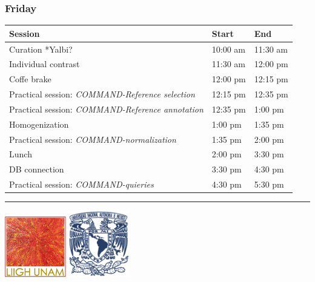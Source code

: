 \documentclass[]{article}
\begin{document}
\subsubsection{Friday}\label{friday}

\begin{longtable}[]{@{}lll@{}}
\toprule
Session & Start & End\tabularnewline
\midrule
\endhead
Curation *Yalbi? & 10:00 am & 11:30 am\tabularnewline
Individual contrast & 11:30 am & 12:00 pm\tabularnewline
 Coffe brake & 12:00 pm & 12:15 pm\tabularnewline
 Practical session: \emph{COMMAND-Reference selection} & 12:15 pm &
12:35 pm\tabularnewline
 Practical session: \emph{COMMAND-Reference annotation} & 12:35 pm &
1:00 pm\tabularnewline
Homogenization & 1:00 pm & 1:35 pm\tabularnewline
 Practical session: \emph{COMMAND-normalization} & 1:35 pm & 2:00
pm\tabularnewline
 Lunch & 2:00 pm & 3:30 pm\tabularnewline
DB connection & 3:30 pm & 4:30 pm\tabularnewline
 Practical session: \emph{COMMAND-quieries} & 4:30 pm & 5:30
pm\tabularnewline
\bottomrule
\end{longtable}

\begin{center}\rule{0.5\linewidth}{\linethickness}\end{center}

\includegraphics[width=0.20000\textwidth]{Pictures/liigh.png}
\includegraphics[width=0.20000\textwidth]{Pictures/UNAM.jpg}
\end{document}
